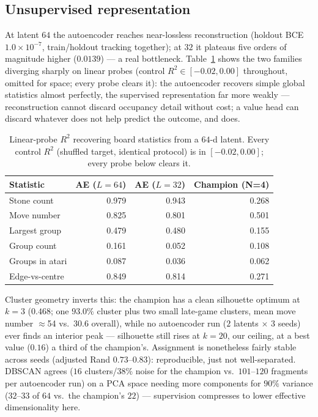 \documentclass[conference,a4paper]{IEEEtran}
\begin{document}
\subsection{Unsupervised representation}
\label{sec:track_b}
At latent $64$ the autoencoder reaches near-lossless reconstruction (holdout
BCE $1.0{\times}10^{-7}$, train/holdout tracking together); at $32$ it
plateaus five orders of magnitude higher ($0.0139$) --- a real bottleneck.
Table~\ref{tab:probes} shows the two families diverging sharply on linear
probes (control $R^2 \in [-0.02, 0.00]$ throughout, omitted for space; every
probe clears it): the autoencoder recovers simple global statistics almost
perfectly, the supervised representation far more weakly --- reconstruction
cannot discard occupancy detail without cost; a value head can discard
whatever does not help predict the outcome, and does.

\begin{table}[t]
\centering
\caption{Linear-probe $R^2$ recovering board statistics from a $64$-d latent.
Every control $R^2$ (shuffled target, identical protocol) is in $[-0.02,
0.00]$; every probe below clears it.}
\label{tab:probes}
\begin{tabular}{lrrr}
\toprule
Statistic & AE ($L{=}64$) & AE ($L{=}32$) & Champion (N=4) \\
\midrule
Stone count & 0.979 & 0.943 & 0.268 \\
Move number & 0.825 & 0.801 & 0.501 \\
Largest group & 0.479 & 0.480 & 0.155 \\
Group count & 0.161 & 0.052 & 0.108 \\
Groups in atari & 0.087 & 0.036 & 0.062 \\
Edge-vs-centre & 0.849 & 0.814 & 0.271 \\
\bottomrule
\end{tabular}
\end{table}

Cluster geometry inverts this: the champion has a clean silhouette optimum at
$k{=}3$ ($0.468$; one $93.0\%$ cluster plus two small late-game clusters,
mean move number $\approx$54 vs.\ $30.6$ overall), while no autoencoder run
($2$ latents $\times$ 3 seeds) ever finds an interior peak --- silhouette
still rises at $k{=}20$, our ceiling, at a best value ($0.16$) a third of the
champion's. Assignment is nonetheless fairly stable across seeds (adjusted
Rand $0.73$--$0.83$): reproducible, just not well-separated. DBSCAN agrees
($16$ clusters/$38\%$ noise for the champion vs.\ $101$--$120$ fragments per
autoencoder run) on a PCA space needing more components for $90\%$ variance
($32$--$33$ of $64$ vs.\ the champion's $22$) --- supervision compresses to
lower effective dimensionality here.
\end{document}
